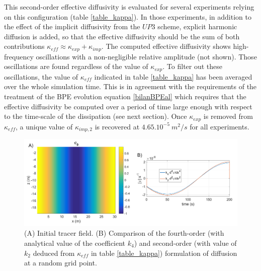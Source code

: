 This second-order effective diffusivity is evaluated for several experiments relying on this configuration (table \ref{table_kappa}). In those experiments, in addition to the effect of the implicit diffusivity from the $UP3$ scheme, explicit harmonic diffusion is added, so that the effective diffusivity should be the sum of both contributions $\kappa_{eff} \approx \kappa_{exp} + \kappa_{imp}$.
The computed effective diffusivity shows high-frequency oscillations with a non-negligible relative amplitude (not shown). Those oscillations are found regardless of the value of $\kappa_{exp}$. To filter out these oscillations, the value of $\kappa_{eff}$ indicated in table \ref{table_kappa} has been averaged over the whole simulation time. This is in agreement with the requirements of the treatment of the BPE evolution equation \ref{bilanBPEal} which requires that the effective diffusivity be computed over a period of time large enough with respect to the time-scale of the dissipation (see next section).
Once $\kappa_{exp}$ is removed from $\kappa_{eff}$, a unique value of $\kappa_{imp,2}$ is recovered at $4.65.10^{-5}\ m^2/s$ for all experiments.

\begin{figure}[h!]
\centering
\includegraphics[width=1\textwidth]{./CHAP_BPE/AGBPE_numlab5.png}
\caption{(A) Initial tracer field. (B) Comparison of the fourth-order (with analytical value of the coefficient $k_4$) and second-order (with value of $k_2$ deduced from $\kappa_{eff}$ in table \ref{table_kappa}) formulation of diffusion at a random grid point.}
\label{fig5numlab}
\end{figure}

